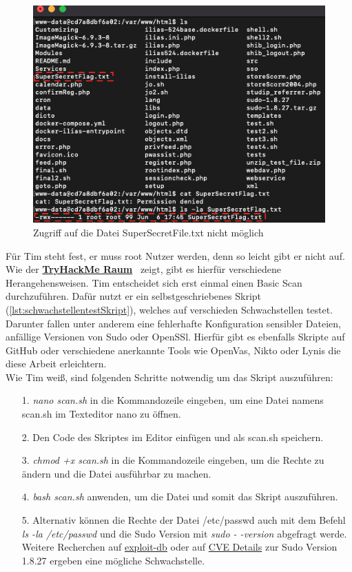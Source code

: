 \documentclass[10pt, a4paper,onecolumn ,titlepage]{article}
\begin{document}
    \begin{figure}[H]
        \centering
        \includegraphics[width=1\textwidth]{storyline_bilder_vm2/FileDenied}
        \caption{Zugriff auf die Datei SuperSecretFile.txt nicht möglich}
        \label{fig:fileDenied}
    \end{figure}
    \noindent
    Für Tim steht fest, er muss root Nutzer werden, denn so leicht gibt er nicht auf.
    Wie der \href{https://tryhackme.com/jr/t1mth3h4ck3rb0y}{\textbf{TryHackMe Raum}}~\parencite{privilegeEscalationRaumTryHackMe} zeigt, gibt es hierfür verschiedene Herangehensweisen.
    Tim entscheidet sich erst einmal einen Basic Scan durchzuführen.
    Dafür nutzt er ein selbstgeschriebenes Skript (\ref{lst:schwachstellentestSkript}), welches auf verschieden Schwachstellen testet.
    Darunter fallen unter anderem eine fehlerhafte Konfiguration sensibler Dateien, anfällige Versionen von Sudo oder OpenSSl.
    Hierfür gibt es ebenfalls Skripte auf GitHub oder verschiedene anerkannte Tools wie OpenVas, Nikto oder Lynis die diese Arbeit erleichtern.
    \\
    Wie Tim weiß, sind folgenden Schritte notwendig um das Skript auszuführen:
    \begin{enumerate}[leftmargin=2.5cm]
        \item[1.] \textit{nano scan.sh}  in die Kommandozeile eingeben, um eine Datei namens scan.sh im Texteditor nano zu öffnen.
        \item[2.] Den Code des Skriptes im Editor einfügen und als scan.sh speichern.
        \item[3.] \textit{chmod +x scan.sh}  in die Kommandozeile eingeben, um die Rechte zu ändern und die Datei ausführbar zu machen.
        \item[4.] \textit{bash scan.sh}  anwenden, um die Datei und somit das Skript auszuführen.
        \item[5.] Alternativ können die Rechte der Datei /etc/passwd auch mit dem Befehl \textit{ls -la /etc/passwd} und die Sudo Version mit \textit{sudo - -version} abgefragt werde.
        Weitere Recherchen auf \href{https://www.exploit-db.com/exploits/47502}{exploit-db} oder auf \href{https://www.cvedetails.com/cve/CVE-2019-14287/}{CVE Details} zur Sudo Version 1.8.27 ergeben eine mögliche Schwachstelle.
    \end{enumerate}
\end{document}

